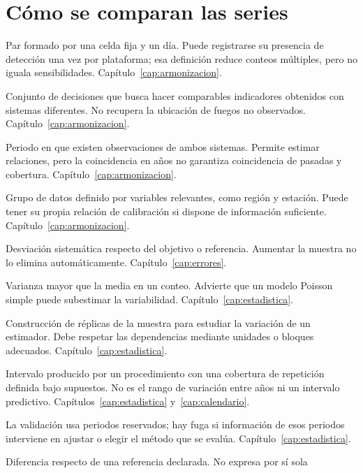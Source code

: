 \section{Cómo se comparan las series}
\begin{description}[style=nextline,leftmargin=1.2em]
\item[Celda-día.] Par formado por una celda fija y un día. Puede registrarse su presencia
de detección una vez por plataforma; esa definición reduce conteos múltiples, pero no
iguala sensibilidades. Capítulo~\ref{cap:armonizacion}.
\item[Armonización.] Conjunto de decisiones que busca hacer comparables indicadores
obtenidos con sistemas diferentes. No recupera la ubicación de fuegos no observados.
Capítulo~\ref{cap:armonizacion}.
\item[Solape.] Periodo en que existen observaciones de ambos sistemas. Permite estimar
relaciones, pero la coincidencia en años no garantiza coincidencia de pasadas y cobertura.
Capítulo~\ref{cap:armonizacion}.
\item[Estrato.] Grupo de datos definido por variables relevantes, como región y estación.
Puede tener su propia relación de calibración si dispone de información suficiente.
Capítulo~\ref{cap:armonizacion}.
\item[Sesgo.] Desviación sistemática respecto del objetivo o referencia. Aumentar la
muestra no lo elimina automáticamente. Capítulo~\ref{cap:errores}.
\item[Sobredispersión.] Varianza mayor que la media en un conteo. Advierte que un modelo
Poisson simple puede subestimar la variabilidad. Capítulo~\ref{cap:estadistica}.
\item[Bootstrap o remuestreo.] Construcción de réplicas de la muestra para estudiar la
variación de un estimador. Debe respetar las dependencias mediante unidades o bloques
adecuados. Capítulo~\ref{cap:estadistica}.
\item[Intervalo de confianza.] Intervalo producido por un procedimiento con una cobertura
de repetición definida bajo supuestos. No es el rango de variación entre años ni un
intervalo predictivo. Capítulos~\ref{cap:estadistica} y~\ref{cap:calendario}.
\item[Validación temporal y fuga de información.] La validación usa periodos reservados;
hay fuga si información de esos periodos interviene en ajustar o elegir el método que
se evalúa. Capítulo~\ref{cap:estadistica}.
\item[Anomalía.] Diferencia respecto de una referencia declarada. No expresa por sí sola

\end{description}
